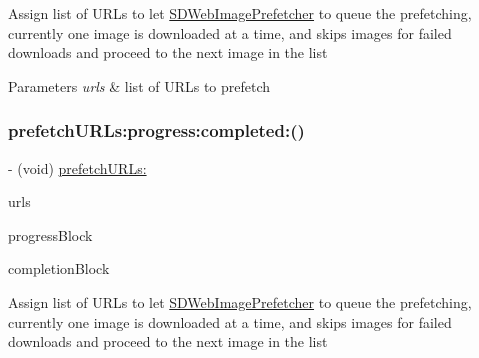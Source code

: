 Assign list of U\+R\+Ls to let \mbox{\hyperlink{interface_s_d_web_image_prefetcher}{S\+D\+Web\+Image\+Prefetcher}} to queue the prefetching, currently one image is downloaded at a time, and skips images for failed downloads and proceed to the next image in the list


\begin{DoxyParams}{Parameters}
{\em urls} & list of U\+R\+Ls to prefetch \\
\hline
\end{DoxyParams}
\mbox{\label{interface_s_d_web_image_prefetcher_a6a7cfba8e166dd1e2039960dfcb98800}} 
\subsubsection{\texorpdfstring{prefetch\+U\+R\+Ls\+:progress\+:completed\+:()}{prefetchURLs:progress:completed:()}\hspace{0.1cm}{\footnotesize\ttfamily [1/3]}}
{\footnotesize\ttfamily -\/ (void) \mbox{\hyperlink{interface_s_d_web_image_prefetcher_aca785918119f2b0d08ee1ff8b5310365}{prefetch\+U\+R\+Ls\+:}} \begin{DoxyParamCaption}\item[{(N\+S\+Array $\ast$)}]{urls }\item[{progress:(S\+D\+Web\+Image\+Prefetcher\+Progress\+Block)}]{progress\+Block }\item[{completed:(S\+D\+Web\+Image\+Prefetcher\+Completion\+Block)}]{completion\+Block }\end{DoxyParamCaption}}

Assign list of U\+R\+Ls to let \mbox{\hyperlink{interface_s_d_web_image_prefetcher}{S\+D\+Web\+Image\+Prefetcher}} to queue the prefetching, currently one image is downloaded at a time, and skips images for failed downloads and proceed to the next image in the list


